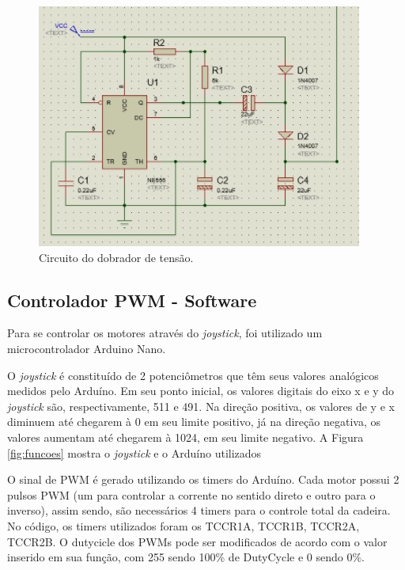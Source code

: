 \begin{figure}[h!]
  \centering
  \includegraphics[scale=0.9]{figuras/Dobrador.jpg}
  \caption{Circuito do dobrador de tensão.}
    \label{fig:dobrador}
\end{figure}

\subsection{Controlador PWM - Software}

Para se controlar os motores através do \textit{joystick}, foi utilizado um
microcontrolador Arduino Nano. 

O \textit{joystick} é constituído de 2 potenciômetros que têm seus valores
analógicos medidos pelo Arduíno. Em seu ponto inicial, os valores digitais do eixo x e y
do \textit{joystick} são, respectivamente, 511 e 491. Na direção positiva, os valores de
y e x diminuem até chegarem à 0 em seu limite positivo, já na direção negativa,
os valores aumentam até chegarem à 1024, em seu limite negativo. A Figura
\ref{fig:funcoes} mostra o \textit{joystick} e o Arduíno utilizados

O sinal de PWM é gerado utilizando os timers do Arduíno. Cada motor possui 2 pulsos PWM (um para controlar a corrente no sentido direto e outro para o inverso), assim sendo, são necessários 4 timers para o controle total da cadeira. No código, os timers utilizados foram os TCCR1A, TCCR1B, TCCR2A, TCCR2B. O dutycicle dos PWMs pode ser modificados de acordo com o valor inserido em sua função, com 255 sendo 100\% de DutyCycle e 0 sendo 0\%.

